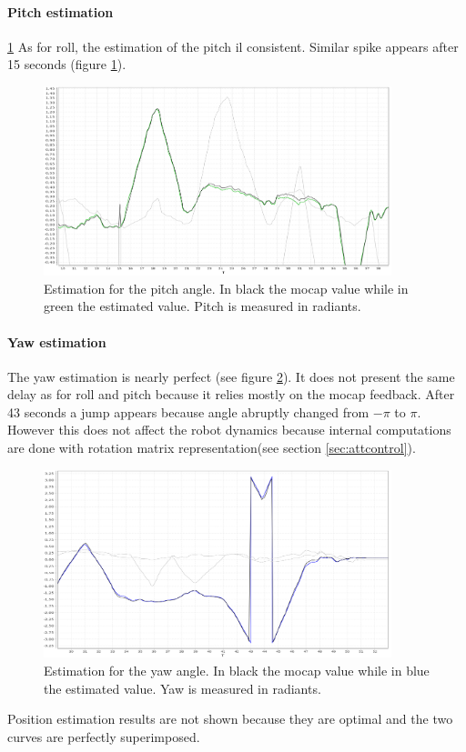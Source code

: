 \paragraph{Pitch estimation}
\ref{figure:pitchesti}
As for roll, the estimation of the pitch il consistent. Similar spike appears after 15 seconds (figure \ref{figure:pitchesti}).

\begin{figure}[h]
	\centering
	\noindent
	\includegraphics[width=0.9\textwidth]{pitch_esti.png}
	\caption[Pitch estimation]{Estimation for the pitch angle. In black the mocap value while in green the estimated value. Pitch is measured in radiants.}
	\label{figure:pitchesti}
\end{figure}


\paragraph{Yaw estimation}

The yaw estimation is nearly perfect (see figure \ref{figure:yawesti}). It does not present the same delay as for roll and pitch because it relies mostly on the mocap feedback. After 43 seconds a jump appears because angle abruptly changed from $-\pi$ to $\pi$. However this does not affect the robot dynamics because internal computations are done with rotation matrix representation(see section \ref{sec:attcontrol}).

\begin{figure}[H]
	\centering
	\noindent
	\includegraphics[width=0.9\textwidth]{yaw_esti.png}
	\caption[Yaw estimation]{Estimation for the yaw angle. In black the mocap value while in blue the estimated value. Yaw is measured in radiants.}
	\label{figure:yawesti}
\end{figure}
\noindent
Position estimation results are not shown because they are optimal and the two curves are perfectly superimposed.

